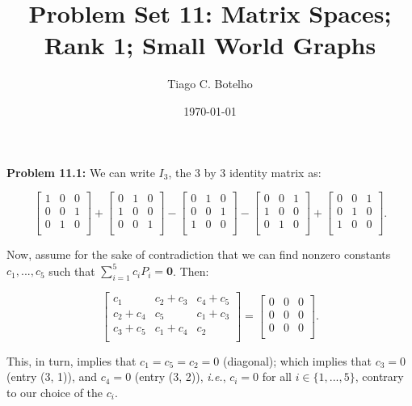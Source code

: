 \documentclass{article}
\title{Problem Set 11: Matrix Spaces; Rank 1; Small World Graphs}
\author{Tiago C. Botelho}
\date{\today}
\begin{document}
\maketitle

\noindent \textbf{Problem 11.1:} We can write $I_3$, the 3 by 3 identity matrix as:

\[
\begin{bmatrix}
1 & 0 & 0\\
0 & 0 & 1\\
0 & 1 & 0\\
\end{bmatrix}
+
\begin{bmatrix}
0 & 1 & 0\\
1 & 0 & 0\\
0 & 0 & 1\\
\end{bmatrix}
-
\begin{bmatrix}
0 & 1 & 0\\
0 & 0 & 1\\
1 & 0 & 0\\
\end{bmatrix}
-
\begin{bmatrix}
0 & 0 & 1\\
1 & 0 & 0\\
0 & 1 & 0\\
\end{bmatrix}
+
\begin{bmatrix}
0 & 0 & 1\\
0 & 1 & 0\\
1 & 0 & 0\\
\end{bmatrix}.
\]

Now, assume for the sake of contradiction that we can find nonzero constants $c_1, ..., c_5$ such that $\sum_{i=1}^{5}c_i P_i = \mathbf{0}$. Then:

\[
\begin{bmatrix}
c_1 & c_2 + c_3 & c_4 + c_5\\
c_2 + c_4 & c_5 & c_1 + c_3\\
c_3 + c_5 & c_1 + c_4 & c_2\\
\end{bmatrix}
=
\begin{bmatrix}
0 & 0 & 0\\
0 & 0 & 0\\
0 & 0 & 0\\
\end{bmatrix}.
\]

This, in turn, implies that $c_1 = c_5 = c_2 = 0$ (diagonal); which implies that $c_3 = 0$ (entry (3, 1)), and $c_4 = 0$ (entry (3, 2)), \textit{i.e.}, $c_i = 0$ for all $i \in \{1, ..., 5\}$, contrary to our choice of the $c_i$.
\end{document}
